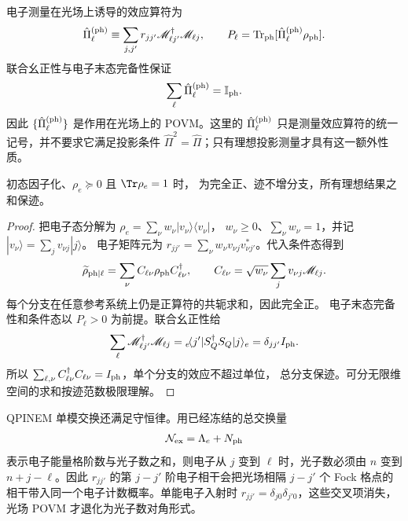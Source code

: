 电子测量在光场上诱导的效应算符为
\begin{equation*}
\hat\Pi_\ell^{({\rm ph})}
\equiv\sum_{j,j'}r_{jj'}
\mathscr M_{\ell j'}^\dagger\mathscr M_{\ell j},
\qquad
P_\ell=\operatorname{Tr}_{\rm ph}
[\hat\Pi_\ell^{({\rm ph})}\rho_{\rm ph}].
\end{equation*}
联合幺正性与电子末态完备性保证
\begin{equation*}
\sum_\ell \hat\Pi_\ell^{({\rm ph})}=\mathbb I_{\rm ph}.
\end{equation*}
因此 $\{\hat\Pi_\ell^{({\rm ph})}\}$ 是作用在光场上的 POVM。这里的 $\hat\Pi_\ell^{({\rm ph})}$ 只是测量效应算符的统一记号，并不要求它满足投影条件 $\hat\Pi^2=\hat\Pi$；只有理想投影测量才具有这一额外性质。

\begin{proposition}[任意电子输入诱导的光场仪器]
初态因子化、$\rho_e\succeq0$ 且 $\Tr\rho_e=1$ 时，
为完全正、迹不增分支，所有理想结果之和保迹。
\end{proposition}
\begin{proof}
把电子态分解为 $\rho_e=\sum_\nu w_\nu|v_\nu\rangle\langle v_\nu|$，
$w_\nu\ge0$、$\sum_\nu w_\nu=1$，并记 $|v_\nu\rangle=\sum_jv_{\nu j}|j\rangle$。
电子矩阵元为 $r_{jj'}=\sum_\nu w_\nu v_{\nu j}v_{\nu j'}^*$。代入条件态得到
\[
 \widetilde\rho_{{\rm ph}|\ell}
 =\sum_\nu C_{\ell\nu}\rho_{\rm ph}C_{\ell\nu}^\dagger,\qquad
 C_{\ell\nu}=\sqrt{w_\nu}\sum_jv_{\nu j}\mathscr M_{\ell j}.
\]
每个分支在任意参考系统上仍是正算符的共轭求和，因此完全正。
电子末态完备性和条件态以 $P_\ell>0$ 为前提。联合幺正性给
\[
 \sum_\ell\mathscr M_{\ell j'}^\dagger\mathscr M_{\ell j}
 ={}_e\!\langle j'|S_Q^\dagger S_Q|j\rangle_e
 =\delta_{jj'}I_{\rm ph}.
\]
所以 $\sum_{\ell,\nu}C_{\ell\nu}^\dagger C_{\ell\nu}=I_{\rm ph}$，单个分支的效应不超过单位，
总分支保迹。可分无限维空间的求和按迹范数极限理解。
\end{proof}

QPINEM 单模交换还满足守恒律。用已经冻结的总交换量
\[
\mathcal N_{\rm ex}=\Lambda_e+N_{\rm ph}
\]
表示电子能量格阶数与光子数之和，则电子从 $j$ 变到 $\ell$ 时，光子数必须由 $n$ 变到 $n+j-\ell$。因此 $r_{jj'}$ 的第 $j-j'$ 阶电子相干会把光场相隔 $j-j'$ 个 Fock 格点的相干带入同一个电子计数概率。单能电子入射时 $r_{jj'}=\delta_{j0}\delta_{j'0}$，这些交叉项消失，光场 POVM 才退化为光子数对角形式。

